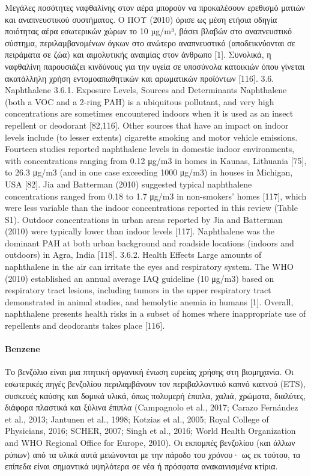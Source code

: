 Μεγάλες ποσότητες ναφθαλίνης στον αέρα μπορούν να προκαλέσουν ερεθισμό ματιών και αναπνευστικού συστήματος. Ο ΠΟΥ (2010) όρισε ως μέση ετήσια οδηγία ποιότητας αέρα εσωτερικών χώρων το 10 µg/m³, βάσει βλαβών στο αναπνευστικό σύστημα, περιλαμβανομένων όγκων στο ανώτερο αναπνευστικό (αποδεικνύονται σε πειράματα σε ζώα) και αιμολυτικής αναιμίας στον άνθρωπο [1]. Συνολικά, η ναφθαλίνη παρουσιάζει κινδύνους για την υγεία σε υποσύνολα κατοικιών όπου γίνεται ακατάλληλη χρήση εντομοαπωθητικών και αρωματικών προϊόντων [116].
 3.6. Naphthalene
3.6.1. Exposure Levels, Sources and Determinants
Naphthalene (both a VOC and a 2-ring PAH) is a ubiquitous pollutant, and very high concentrations are sometimes encountered indoors when it is used as an insect repellent or deodorant [82,116]. Other sources that have an impact on indoor levels include (to lesser extents) cigarette smoking and motor vehicle emissions.
Fourteen studies reported naphthalene levels in domestic indoor environments, with concentrations ranging from 0.12 μg/m3 in homes in Kaunas, Lithuania [75], to 26.3 μg/m3 (and in one case exceeding 1000 μg/m3) in houses in Michigan, USA [82]. Jia and Batterman (2010) suggested typical naphthalene concentrations ranged from 0.18 to 1.7 μg/m3 in non-smokers’ homes [117], which were less variable than the indoor concentrations reported in this review (Table S1). Outdoor concentrations in urban areas reported by Jia and Batterman (2010) were typically lower than indoor levels [117]. Naphthalene was the dominant PAH at both urban background and roadside locations (indoors and outdoors) in Agra, India [118].
3.6.2. Health Effects
Large amounts of naphthalene in the air can irritate the eyes and respiratory system. The WHO (2010) established an annual average IAQ guideline (10 μg/m3) based on respiratory tract lesions, including tumors in the upper respiratory tract demonstrated in animal studies, and hemolytic anemia in humans [1]. Overall, naphthalene presents health risks in a subset of homes where inappropriate use of repellents and deodorants takes place [116].

\cite{ijerph17238972}

\paragraph{Benzene}
Το βενζόλιο είναι μια πτητική οργανική ένωση ευρείας χρήσης στη βιομηχανία. Οι εσωτερικές πηγές βενζολίου περιλαμβάνουν τον περιβαλλοντικό καπνό καπνού (ETS), συσκευές καύσης και δομικά υλικά, όπως πολυμερή έπιπλα, χαλιά, χρώματα, διαλύτες, διάφορα πλαστικά και ξύλινα έπιπλα (Campagnolo et al., 2017; Carazo Fernández et al., 2013; Jantunen et al., 1998; Kotzias et al., 2005; Royal College of Physicians, 2016; SCHER, 2007; Singh et al., 2016; World Health Organization and WHO Regional Office for Europe, 2010). Οι εκπομπές βενζολίου (και άλλων ρύπων) από τα υλικά αυτά μειώνονται με την πάροδο του χρόνου· ως εκ τούτου, τα επίπεδα είναι σημαντικά υψηλότερα σε νέα ή πρόσφατα ανακαινισμένα κτίρια.

